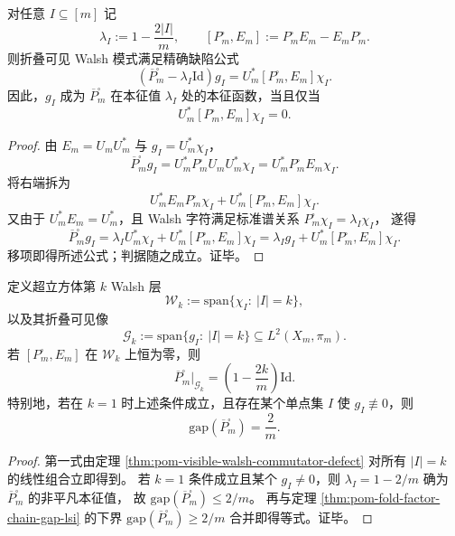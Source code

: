 
\begin{theorem}\label{thm:pom-visible-walsh-commutator-defect}
对任意 \(I\subseteq[m]\) 记
\[
\lambda_I:=1-\frac{2|I|}{m},
\qquad
[P_m^\square,E_m]:=P_m^\square E_m-E_mP_m^\square.
\]
则折叠可见 Walsh 模式满足精确缺陷公式
\[
(\overline P_m^\square-\lambda_I\mathrm{Id})g_I
=U_m^\ast[P_m^\square,E_m]\chi_I.
\]
因此，\(g_I\) 成为 \(\overline P_m^\square\) 在本征值 \(\lambda_I\) 处的本征函数，当且仅当
\[
U_m^\ast[P_m^\square,E_m]\chi_I=0.
\]
\end{theorem}
\begin{proof}
由 \(E_m=U_mU_m^\ast\) 与 \(g_I=U_m^\ast\chi_I\)，
\[
\overline P_m^\square g_I
=U_m^\ast P_m^\square U_mU_m^\ast\chi_I
=U_m^\ast P_m^\square E_m\chi_I.
\]
将右端拆为
\[
U_m^\ast E_mP_m^\square\chi_I
+U_m^\ast[P_m^\square,E_m]\chi_I.
\]
又由于 \(U_m^\ast E_m=U_m^\ast\)，且 Walsh 字符满足标准谱关系
\(
P_m^\square\chi_I=\lambda_I\chi_I
\)，
遂得
\[
\overline P_m^\square g_I
=\lambda_I U_m^\ast\chi_I+U_m^\ast[P_m^\square,E_m]\chi_I
=\lambda_I g_I+U_m^\ast[P_m^\square,E_m]\chi_I.
\]
移项即得所述公式；判据随之成立。证毕。
\end{proof}


\begin{corollary}[逐层精确继承与首谱隙饱和的充分条件]\label{cor:pom-visible-walsh-sectorwise-inheritance}
定义超立方体第 \(k\) Walsh 层
\[
\mathcal W_k:=\mathrm{span}\{\chi_I:\ |I|=k\},
\]
以及其折叠可见像
\[
\mathcal G_k:=\mathrm{span}\{g_I:\ |I|=k\}\subseteq L^2(X_m,\pi_m).
\]
若 \([P_m^\square,E_m]\) 在 \(\mathcal W_k\) 上恒为零，则
\[
\overline P_m^\square|_{\mathcal G_k}
=\left(1-\frac{2k}{m}\right)\mathrm{Id}.
\]
特别地，若在 \(k=1\) 时上述条件成立，且存在某个单点集 \(I\) 使 \(g_I\not\equiv0\)，则
\[
\mathrm{gap}(\overline P_m^\square)=\frac{2}{m}.
\]
\end{corollary}
\begin{proof}
第一式由定理 \ref{thm:pom-visible-walsh-commutator-defect} 对所有 \(|I|=k\) 的线性组合立即得到。
若 \(k=1\) 条件成立且某个 \(g_I\neq0\)，则 \(\lambda_I=1-2/m\) 确为 \(\overline P_m^\square\) 的非平凡本征值，
故
\(
\mathrm{gap}(\overline P_m^\square)\le 2/m
\)。
再与定理 \ref{thm:pom-fold-factor-chain-gap-lsi} 的下界
\(
\mathrm{gap}(\overline P_m^\square)\ge 2/m
\)
合并即得等式。证毕。
\end{proof}

